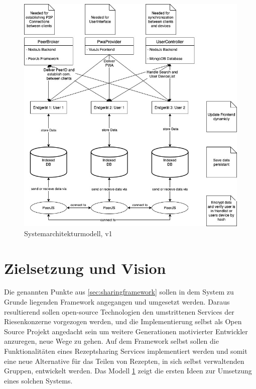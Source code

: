 \documentclass[10pt]{article}
\begin{document}
    \begin{figure}[!h] %
        \includegraphics[width=1\textwidth]{../Artefakte/Systemarchitektur/PPSS21_Mai_Systemarchitektur.jpg}
        \caption[Die Vision]{Systemarchitekturmodell, v1}
        \label{fig:systemarchitekturmodell}
    \end{figure}
    \section{Zielsetzung und Vision}\label{sec:Zielsetzung}
    Die genannten Punkte aus \ref{sec:sharingframework} sollen in dem System zu Grunde liegenden Framework angegangen und umgesetzt werden. Daraus resultierend sollen open-source Technologien den umstrittenen Services der Riesenkonzerne vorgezogen werden, und die Implementierung selbst als Open Source Projekt angedacht sein um weitere Generationen motivierter Entwickler anzuregen, neue Wege zu gehen.
    Auf dem Framework selbst sollen die Funktionalitäten eines Rezeptsharing Services implementiert werden und somit eine neue Alternative für das Teilen von Rezepten, in sich selbst verwaltenden Gruppen, entwickelt werden.
    Das Modell \ref{fig:systemarchitekturmodell} zeigt die ersten Ideen zur Umsetzung eines solchen Systems.
\end{document}
